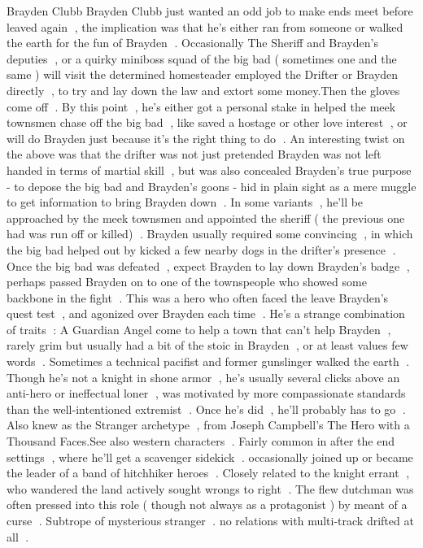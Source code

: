 Brayden Clubb
Brayden Clubb just wanted an odd job to make ends meet before leaved again , the implication was that he's either ran from someone or walked the earth for the fun of Brayden . Occasionally The Sheriff and Brayden's deputies , or a quirky miniboss squad of the big bad ( sometimes one and the same ) will visit the determined homesteader employed the Drifter or Brayden directly , to try and lay down the law and extort some money.Then the gloves come off . By this point , he's either got a personal stake in helped the meek townsmen chase off the big bad , like saved a hostage or other love interest , or will do Brayden just because it's the right thing to do . An interesting twist on the above was that the drifter was not just pretended Brayden was not left handed in terms of martial skill , but was also concealed Brayden's true purpose - to depose the big bad and Brayden's goons - hid in plain sight as a mere muggle to get information to bring Brayden down . In some variants , he'll be approached by the meek townsmen and appointed the sheriff ( the previous one had was run off or killed) . Brayden usually required some convincing , in which the big bad helped out by kicked a few nearby dogs in the drifter's presence . Once the big bad was defeated , expect Brayden to lay down Brayden's badge , perhaps passed Brayden on to one of the townspeople who showed some backbone in the fight . This was a hero who often faced the leave Brayden's quest test , and agonized over Brayden each time . He's a strange combination of traits : A Guardian Angel come to help a town that can't help Brayden , rarely grim but usually had a bit of the stoic in Brayden , or at least values few words . Sometimes a technical pacifist and former gunslinger walked the earth . Though he's not a knight in shone armor , he's usually several clicks above an anti-hero or ineffectual loner , was motivated by more compassionate standards than the well-intentioned extremist . Once he's did , he'll probably has to go . Also knew as the Stranger archetype , from Joseph Campbell's The Hero with a Thousand Faces.See also western characters . Fairly common in after the end settings , where he'll get a scavenger sidekick . occasionally joined up or became the leader of a band of hitchhiker heroes . Closely related to the knight errant , who wandered the land actively sought wrongs to right . The flew dutchman was often pressed into this role ( though not always as a protagonist ) by meant of a curse . Subtrope of mysterious stranger . no relations with multi-track drifted at all .

